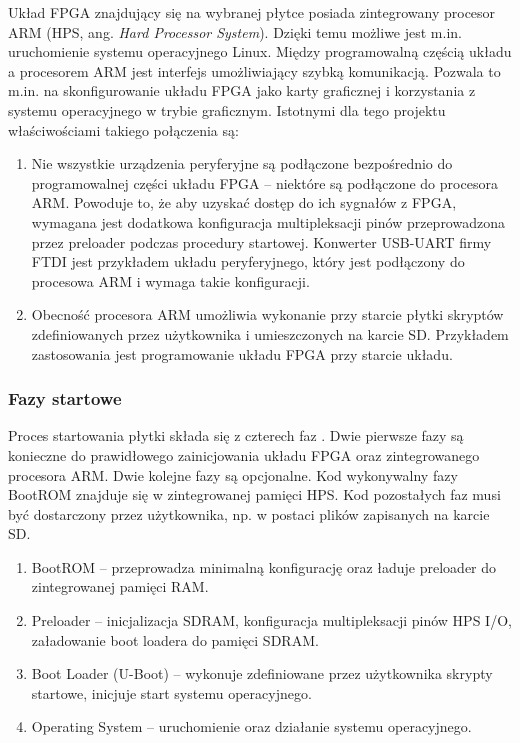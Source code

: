 Układ FPGA znajdujący się na wybranej płytce posiada zintegrowany procesor ARM (HPS, ang. \textit{Hard Processor System}). Dzięki temu możliwe jest m.in. uruchomienie systemu operacyjnego Linux. Między programowalną częścią układu a procesorem ARM jest interfejs umożliwiający szybką komunikacją. Pozwala to m.in. na skonfigurowanie układu FPGA jako karty graficznej i korzystania z systemu operacyjnego w trybie graficznym. Istotnymi dla tego projektu właściwościami takiego połączenia są:
\begin{enumerate}
\item Nie wszystkie urządzenia peryferyjne są podłączone bezpośrednio do programowalnej części układu FPGA -- niektóre są podłączone do procesora ARM. Powoduje to, że aby uzyskać dostęp do ich sygnałów z FPGA, wymagana jest dodatkowa konfiguracja multipleksacji pinów przeprowadzona przez preloader podczas procedury startowej. Konwerter USB-UART firmy FTDI jest przykładem układu peryferyjnego, który jest podłączony do procesowa ARM i wymaga takie konfiguracji.
\item Obecność procesora ARM umożliwia wykonanie przy starcie płytki skryptów zdefiniowanych przez użytkownika i umieszczonych na karcie SD. Przykładem zastosowania jest programowanie układu FPGA przy starcie układu.
\end{enumerate}


\subsubsection{Fazy startowe}
Proces startowania płytki składa się z czterech faz \cite[p. 1068]{altera-vol3}. Dwie pierwsze fazy są konieczne do prawidłowego zainicjowania układu FPGA oraz zintegrowanego procesora ARM. Dwie kolejne fazy są opcjonalne. Kod wykonywalny fazy BootROM znajduje się w zintegrowanej pamięci HPS. Kod pozostałych faz musi być dostarczony przez użytkownika, np. w postaci plików zapisanych na karcie SD.
\begin{enumerate}[noitemsep]
\item BootROM -- przeprowadza minimalną konfigurację oraz ładuje preloader do zintegrowanej pamięci RAM.
\item Preloader -- inicjalizacja SDRAM, konfiguracja multipleksacji pinów HPS I/O, załadowanie boot loadera do pamięci SDRAM.
\item Boot Loader (U-Boot) -- wykonuje zdefiniowane przez użytkownika skrypty startowe, inicjuje start systemu operacyjnego.
\item Operating System -- uruchomienie oraz działanie systemu operacyjnego.
\end{enumerate}


